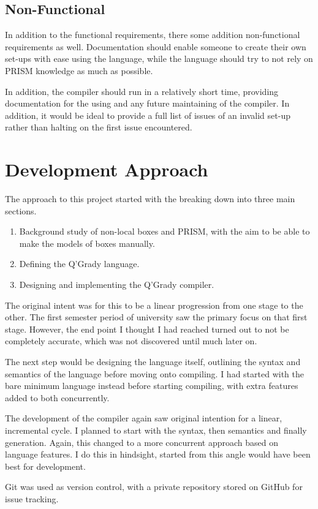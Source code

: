 \documentclass[report.tex]{subfiles}
\begin{document}
\subsection{Non-Functional} %
\label{sub:non_functional}
In addition to the functional requirements, there some addition non-functional
requirements as well. Documentation should enable someone to create their own
set-ups with ease using the language, while the language should try to not rely
on PRISM knowledge as much as possible.

In addition, the compiler should run in a relatively short time, providing
documentation for the using and any future maintaining of the compiler. In
addition, it would be ideal to provide a full list of issues of an invalid
set-up rather than halting on the first issue encountered.

\section{Development Approach} %
\label{sec:development_approach}
The approach to this project started with the breaking down into three main
sections.
\begin{enumerate}
    \item Background study of non-local boxes and PRISM, with the aim to be able
    to make the models of boxes manually.
    \item Defining the Q'Grady language.
    \item Designing and implementing the Q'Grady compiler.
\end{enumerate}

The original intent was for this to be a linear progression from one stage to
the other. The first semester period of university saw the primary focus on that
first stage. However, the end point I thought I had reached turned out to not
be completely accurate, which was not discovered until much later on.

The next step would be designing the language itself, outlining the syntax
and semantics of the language before moving onto compiling. I had started with
the bare minimum language instead before starting compiling, with extra features
added to both concurrently.

The development of the compiler again saw original intention for a linear,
incremental cycle. I planned to start with the syntax, then semantics and
finally generation. Again, this changed to a more concurrent approach based on
language features. I do this in hindsight, started from this angle would have
been best for development.

Git was used as version control, with a private repository stored on GitHub for
issue tracking.
\newpage
\end{document}
